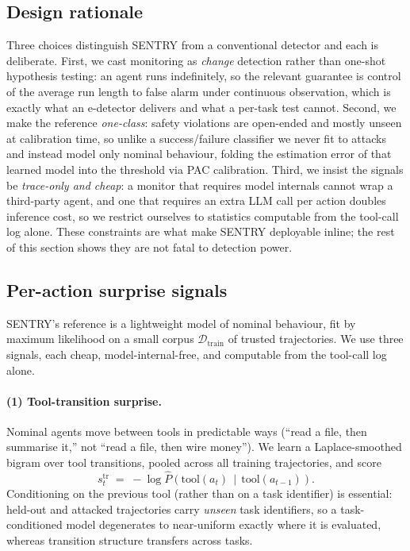 \documentclass[pdflatex,sn-mathphys-num]{sn-jnl}%
\theoremstyle{thmstyleone}%
\theoremstyle{thmstyletwo}%
\theoremstyle{thmstylethree}%
\newcommand{\Dcal}{\mathcal{D}}
\begin{document}
\subsection{Design rationale}\label{sec:rationale}

Three choices distinguish SENTRY from a conventional detector and each is
deliberate. First, we cast monitoring as \emph{change} detection rather than
one-shot hypothesis testing: an agent runs indefinitely, so the relevant
guarantee is control of the average run length to false alarm under continuous
observation, which is exactly what an e-detector delivers and what a per-task
test cannot. Second, we make the reference \emph{one-class}: safety violations
are open-ended and mostly unseen at calibration time, so unlike a
success/failure classifier we never fit to attacks and instead model only
nominal behaviour, folding the estimation error of that learned model into the
threshold via PAC calibration. Third, we insist the signals be
\emph{trace-only and cheap}: a monitor that requires model internals cannot
wrap a third-party agent, and one that requires an extra LLM call per action
doubles inference cost, so we restrict ourselves to statistics computable from
the tool-call log alone. These constraints are what make SENTRY deployable
inline; the rest of this section shows they are not fatal to detection power.

\subsection{Per-action surprise signals}\label{sec:signals}

SENTRY's reference is a lightweight model of nominal behaviour, fit by maximum
likelihood on a small corpus \(\Dcal_{\mathrm{train}}\) of trusted
trajectories. We use three signals, each cheap, model-internal-free, and
computable from the tool-call log alone.

\paragraph{(1) Tool-transition surprise.} Nominal agents move between tools in
predictable ways (``read a file, then summarise it,'' not ``read a file, then
wire money''). We learn a Laplace-smoothed bigram over tool transitions,
pooled across all training trajectories, and score
\begin{equation}
s^{\mathrm{tr}}_t \;=\; -\log \hat{P}\!\left(\mathrm{tool}(a_t)\,\middle|\,
   \mathrm{tool}(a_{t-1})\right).
\label{eq:transition}
\end{equation}
Conditioning on the previous tool (rather than on a task identifier)
is essential: held-out and attacked trajectories carry \emph{unseen} task
identifiers, so a task-conditioned model degenerates to near-uniform exactly
where it is evaluated, whereas transition structure transfers across tasks.
\end{document}
